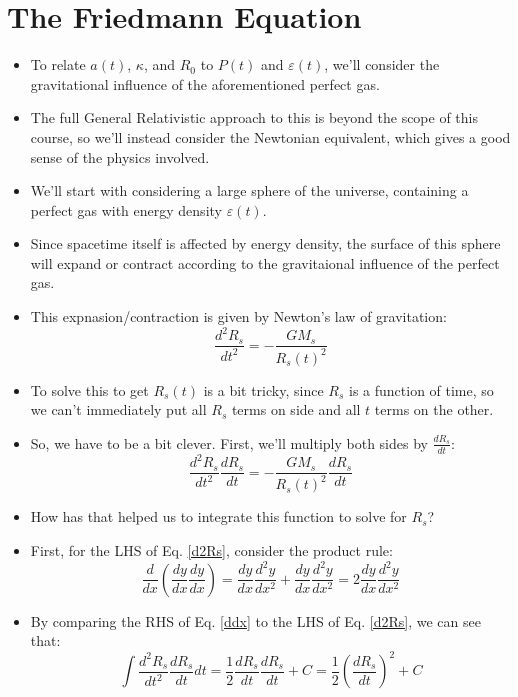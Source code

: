 \documentclass[11pt]{article}
\begin{document}
\section{The Friedmann Equation}
\begin{itemize}
\item To relate $a(t)$, $\kappa$, and $R_0$ to $P(t)$ and $\varepsilon(t)$, we'll consider the gravitational influence of the aforementioned perfect gas.
\item The full General Relativistic approach to this is beyond the scope of this course, so we'll instead consider the Newtonian equivalent, which gives a good sense of the physics involved.
\item We'll start with considering a large sphere of the universe, containing a perfect gas with energy density $\varepsilon(t)$.
\item Since spacetime itself is affected by energy density, the surface of this sphere will expand or contract according to the gravitaional influence of the perfect gas.
\item This expnasion/contraction is given by Newton's law of gravitation:
\begin{equation}
\frac{d^2R_s}{dt^2} = -\frac{GM_s}{R_s(t)^2}
\end{equation}
\item To solve this to get $R_s(t)$ is a bit tricky, since $R_s$ is a function of time, so we can't immediately put all $R_s$ terms on side and all $t$ terms on the other.
\item So, we have to be a bit clever. First, we'll multiply both sides by $\frac{dR_s}{dt}$:
\begin{equation}
    \label{d2Rs}
    \frac{d^2R_s}{dt^2}\frac{dR_s}{dt} = -\frac{GM_s}{R_s(t)^2}\frac{dR_s}{dt}
\end{equation}
\item How has that helped us to integrate this function to solve for $R_s$?
\item First, for the LHS of Eq. \ref{d2Rs}, consider the product rule:
\begin{equation}
\label{ddx}
    \frac{d}{dx}\left(\frac{dy}{dx}\frac{dy}{dx}\right) = \frac{dy}{dx}\frac{d^2y}{dx^2}+\frac{dy}{dx}\frac{d^2y}{dx^2} = 2\frac{dy}{dx}\frac{d^2y}{dx^2}
\end{equation}
\item By comparing the RHS of Eq. \ref{ddx} to the LHS of Eq. \ref{d2Rs}, we can see that:
\begin{equation}
\int\frac{d^2R_s}{dt^2}\frac{dR_s}{dt} dt = \frac{1}{2}\frac{dR_s}{dt}\frac{dR_s}{dt} + C = \frac{1}{2}\left(\frac{dR_s}{dt}\right)^2 + C

\end{equation}
\end{itemize}
\end{document}
